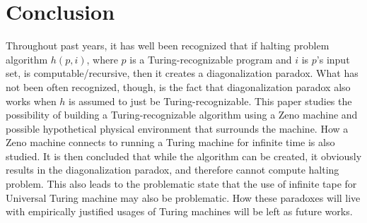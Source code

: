 \documentclass{roffin}
\begin{document}
\section{Conclusion}
Throughout past years, it has well been recognized that if halting problem algorithm $h(p,i)$, where $p$ is a Turing-recognizable program and $i$ is $p$'s input set, is computable/recursive, then it creates a diagonalization paradox. What has not been often recognized, though, is the fact that diagonalization paradox also works when $h$ is assumed to just be Turing-recognizable. This paper studies the possibility of building a Turing-recognizable algorithm using a Zeno machine and possible hypothetical physical environment that surrounds the machine. How a Zeno machine connects to running a Turing machine for infinite time is also studied. It is then concluded that while the algorithm can be created, it obviously results in the diagonalization paradox, and therefore cannot compute halting problem. This also leads to the problematic state that the use of infinite tape for Universal Turing machine may also be problematic. How these paradoxes will live with empirically justified usages of Turing machines will be left as future works.
\end{document}
